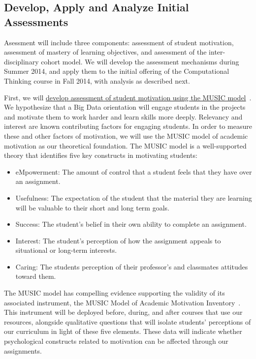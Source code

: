 \documentclass[11pt]{article}
\begin{document}
\subsection{Develop, Apply and Analyze Initial Assessments}
Asessment will include three components: assessment of student
motivation, assessment of mastery of learning objectives, and
assessment of the inter-disciplinary cohort model. We will develop the
assessment mechanisms during Summer 2014, and apply them to the
initial offering of the Computational Thinking course in Fall 2014,
with analysis as described next.

First, we will \uline{develop assessment of student motivation using the MUSIC model}~\cite{jones-description}.
We hypothesize that a Big Data orientation will
engage students in the projects and motivate them to work harder and
learn skills more deeply. Relevancy and interest are known
contributing factors for engaging students.
In order to measure these and other
factors of motivation, we will use the MUSIC model of academic
motivation as our theoretical foundation.
The MUSIC model is a well-supported theory that identifies five key
constructs in motivating students:
\begin{itemize}
	\item eMpowerment: The amount of control that a student feels that they have over an assignment.
	\item Usefulness: The expectation of the student that the material they are learning will be valuable to their short and long term goals.
	\item Success: The student's belief in their own ability to complete an assignment.
	\item Interest: The student's perception of how the assignment appeals to situational or long-term interests.
	\item Caring: The students perception of their professor's and classmates attitudes toward them.
\end{itemize}

The MUSIC model has compelling evidence supporting the validity of its
associated instrument, the MUSIC Model of Academic Motivation
Inventory~\cite{jones-validity}.
This instrument will be deployed
before, during, and after courses that use our resources, alongside
qualitative questions that will isolate students' perceptions of our
curriculum in light of these five elements. 
These data will indicate whether psychological constructs related to
motivation can be affected through our assignments.
\end{document}
